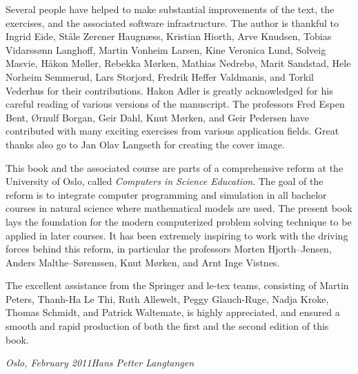 Several people have helped to make substantial improvements of the
text, the exercises, and the associated software infrastructure. The
author is thankful to Ingrid Eide, St{\aa}le Zerener Haugn{\ae}ss,
Kristian Hiorth,
Arve Knudsen, Tobias Vidarss{\o}nn Langhoff, Martin Vonheim Larsen,
Kine Veronica Lund,
Solveig Masvie, H{\aa}kon M{\o}ller, Rebekka M{\o}rken,
Mathias Nedreb{\o},
Marit Sandstad, Hele Norheim Semmerud, Lars Storjord,
Fredrik Heffer Valdmanis, and Torkil Vederhus for their
contributions. Hakon Adler is greatly acknowledged for his careful
reading of various versions of the manuscript.  The professors Fred
Espen Bent, {\O}rnulf Borgan, Geir Dahl, Knut M{\o}rken, and Geir
Pedersen have contributed with many exciting exercises from various
application fields. Great thanks also go to Jan Olav Langseth for
creating the cover image.

This book and the associated course are parts of a comprehensive
reform at the University of Oslo, called \emph{Computers in Science
Education}. The goal of the reform is to integrate computer
programming and simulation in all bachelor courses in natural science
where mathematical models are used.  The present book lays the
foundation for the modern computerized problem solving technique to be
applied in later courses.  It has been extremely inspiring to work
with the driving forces behind this reform, in particular the
professors Morten Hjorth--Jensen, Anders Malthe--S{\o}renssen, Knut
M{\o}rken, and Arnt Inge Vistnes.

The excellent assistance from the Springer and le-tex teams,
consisting of Martin Peters, Thanh-Ha Le Thi, Ruth Allewelt, Peggy
Glauch-Ruge, Nadja Kroke, Thomas Schmidt, and Patrick Waltemate,
is highly appreciated, and ensured a smooth and rapid production of both
the first and the second edition of this book.

\vspace{1cm}

\noindent
{\it Oslo, February 2011}\hfill {\it Hans Petter Langtangen}


